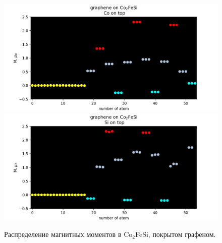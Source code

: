 \begin{figure}[h]
    \centering
    \includegraphics[scale=0.5]{images/co2fesi-graphene-090920_magn_3.png}
    \includegraphics[scale=0.5]{images/co2fesi-graphene-sico-080920_magn_3.png}
    \caption{Распределение магнитных моментов в Co$_2$FeSi, покрытом графеном. }
    \label{fig:magn2}
\end{figure}

